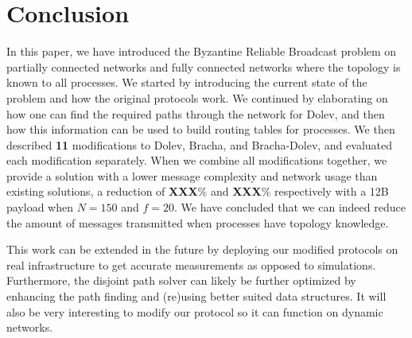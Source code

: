 \section{Conclusion}
\label{conclusion}


In this paper, we have introduced the Byzantine Reliable Broadcast problem on partially connected networks and fully connected networks where the topology is known to all processes. We started by introducing the current state of the problem and how the original protocols work. We continued by elaborating on how one can find the required paths through the network for Dolev, and then how this information can be used to build routing tables for processes. We then described \textbf{11} modifications to Dolev, Bracha, and Bracha-Dolev, and evaluated each modification separately. When we combine all modifications together, we provide a solution with a lower message complexity and network usage than existing solutions, a reduction of \textbf{XXX}\% and \textbf{XXX}\% respectively with a 12B payload when $N=150$ and $f=20$.
We have concluded that we can indeed reduce the amount of messages transmitted when processes have topology knowledge.

This work can be extended in the future by deploying our modified protocols on real infrastructure to get accurate measurements as opposed to simulations. Furthermore, the disjoint path solver can likely be further optimized by enhancing the path finding and (re)using better suited data structures. It will also be very interesting to modify our protocol so it can function on dynamic networks.
